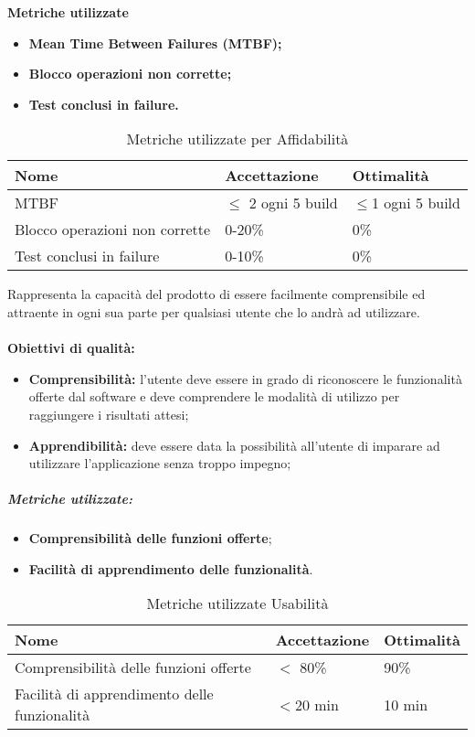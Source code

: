 \textbf{Metriche utilizzate}
\begin{itemize}
	\item \textbf{Mean Time Between Failures (MTBF)\pedice;}
	\item \textbf{Blocco operazioni non corrette;}
	\item \textbf{Test conclusi in failure.}
\end{itemize}
\begin{table}[!htpb]
	\centering
	\renewcommand{\arraystretch}{2} 
	\begin{tabular}{|l|l|l|}
		\rowcolor{orange!50}
		\hline
		\textbf{Nome} &  \textbf{Accettazione} & \textbf{Ottimalità} \\ \hline
		MTBF     & $\leq$ 2 ogni 5 build & $\leq$1 ogni 5 build          \\ \hline
		Blocco operazioni non corrette   &    0-20\% &  0\%       \\ \hline
		Test conclusi in failure          &     0-10\%          &      0\%        \\ \hline
	\end{tabular}
	\caption{Metriche utilizzate per Affidabilità}
\end{table}
Rappresenta la capacità del prodotto di essere facilmente comprensibile ed attraente in ogni sua parte per qualsiasi utente che lo andrà ad utilizzare.\\\\
\textbf{Obiettivi di qualità:}
\begin{itemize}
    \item \textbf{Comprensibilità:} l’utente deve essere in grado di riconoscere le funzionalità offerte dal software e deve comprendere le modalità di utilizzo per raggiungere i risultati attesi;
    \item \textbf{Apprendibilità:} deve essere data la possibilità all'utente di imparare ad utilizzare l’applicazione senza troppo impegno;
\end{itemize}
\subparagraph{Metriche utilizzate:}
\begin{itemize}
    \item \textbf{Comprensibilità delle funzioni offerte};
    \item \textbf{Facilità di apprendimento delle funzionalità}.
\end{itemize}
\begin{table}[!htpb]
	\centering
	\renewcommand{\arraystretch}{2} 
		\begin{tabular}{|l|l|l|}
			\rowcolor{orange!50}
			\hline
			\textbf{Nome} & \textbf{Accettazione} & \textbf{Ottimalità} \\ \hline
			Comprensibilità delle funzioni offerte        &           $<$ 80\%            &      90\%         \\
			\hline
			Facilità di apprendimento delle funzionalità        &           $<$20 min            &      10 min         \\   \hline                       
		\end{tabular}
	\caption{Metriche utilizzate Usabilità}
\end{table}
